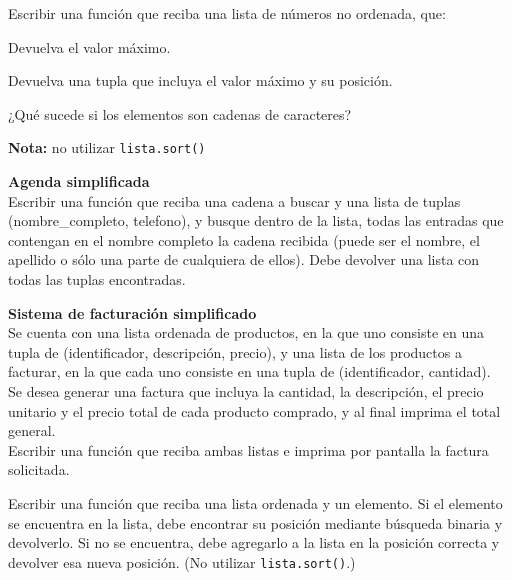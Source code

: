 \begin{ejercicio}
Escribir una función que reciba una lista de números no ordenada, que:
\begin{partes}
\item Devuelva el valor máximo.
\item Devuelva una tupla que incluya el valor máximo y su posición.
\item ¿Qué sucede si los elementos son cadenas de caracteres?
\end{partes}
{\bf Nota:} no utilizar \verb!lista.sort()!
\end{ejercicio}


\begin{ejercicio}
{\bf Agenda simplificada} \\
Escribir una función que reciba una cadena a buscar y una lista de tuplas
(nombre\_completo, telefono), y busque dentro de la lista, todas las
entradas que contengan en el nombre completo la cadena recibida (puede
ser el nombre, el apellido o sólo una parte de cualquiera de ellos).
Debe devolver una lista con todas las tuplas encontradas.
\end{ejercicio}


\begin{ejercicio}
{\bf Sistema de facturación simplificado} \\
Se cuenta con una lista ordenada de productos, en la que uno consiste en
una tupla de (identificador, descripción, precio), y una lista de los
productos a facturar, en la que cada uno consiste en una tupla de
(identificador, cantidad). \\
Se desea generar una factura que incluya la cantidad, la descripción, el
precio unitario y el precio total de cada producto comprado, y al final
imprima el total general. \\
Escribir una función que reciba ambas listas e imprima por
pantalla la factura solicitada.
\end{ejercicio}


\begin{ejercicio}
Escribir una función que reciba una lista ordenada y un elemento. Si el
elemento se encuentra en la lista, debe encontrar su posición mediante
búsqueda binaria y devolverlo.  Si no se encuentra, debe agregarlo a la
lista en la posición correcta y devolver esa nueva posición. (No utilizar
\verb!lista.sort()!.)
\end{ejercicio}


